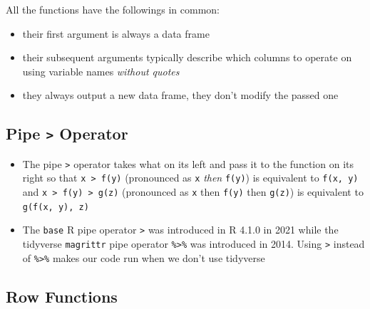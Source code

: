 \documentclass[
  letterpaper,
  DIV=11,
  numbers=noendperiod]{scrreprt}
\providecommand{\tightlist}{%
  \setlength{\itemsep}{0pt}\setlength{\parskip}{0pt}}\usepackage{longtable,booktabs,array}
\begin{document}
All the functions have the followings in common:

\begin{itemize}
\tightlist
\item
  their first argument is always a data frame
\item
  their subsequent arguments typically describe which columns to operate
  on using variable names \emph{without quotes}
\item
  they always output a new data frame, they don't modify the passed one
\end{itemize}

\subsection{\texorpdfstring{Pipe \texttt{\textbar{}\textgreater{}}
Operator}{Pipe \textbar\textgreater{} Operator}}\label{pipe-operator}

\begin{itemize}
\tightlist
\item
  The pipe \texttt{\textbar{}\textgreater{}} operator takes what on its
  left and pass it to the function on its right so that
  \texttt{x\ \textbar{}\textgreater{}\ f(y)} (pronounced as \texttt{x}
  \emph{then} \texttt{f(y)}) is equivalent to \texttt{f(x,\ y)} and
  \texttt{x\ \textbar{}\textgreater{}\ f(y)\ \textbar{}\textgreater{}\ g(z)}
  (pronounced as \texttt{x} then \texttt{f(y)} then \texttt{g(z)}) is
  equivalent to \texttt{g(f(x,\ y),\ z)}
\item
  The \texttt{base} R pipe operator \texttt{\textbar{}\textgreater{}}
  was introduced in R 4.1.0 in 2021 while the tidyverse
  \texttt{magrittr} pipe operator \texttt{\%\textgreater{}\%} was
  introduced in 2014. Using \texttt{\textbar{}\textgreater{}} instead of
  \texttt{\%\textgreater{}\%} makes our code run when we don't use
  tidyverse
\end{itemize}

\subsection{Row Functions}\label{row-functions}
\end{document}

